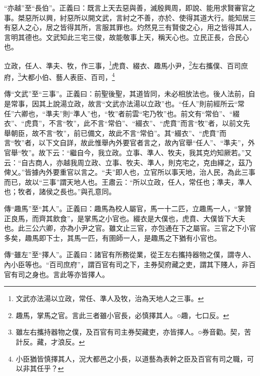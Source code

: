 {\noindent\shu{}\fzkt “亦越”至“長伯”。正義曰：既言上天去惡與善，滅殷興周，即說、能用求賢審官之事。桀惡所以興，紂惡所以開文武，言紂之不善，亦於、使得其道大行。能知居三有惡人之心，居之皆得其所，言服其罪也。灼然見三有賢俊之心，用之皆得其人，言明其德也。文武知此三宅三俊，故能敬事上天，稱天心也。立民正長，合民心也。 \par}

立政，任人、準夫、牧，作三事，\footnote{文武亦法湯以立政，常任、準人及牧，治為天地人之三事。}虎賁、綴衣、趣馬小尹，\footnote{趣馬，掌馬之官。言此三者雖小官長，必慎擇其人。○趣，七口反。}左右攜僕、百司庶府，\footnote{雖左右攜持器物之僕，及百官有司主券契藏吏，亦皆擇人。○券音勸。契，苦計反。藏，才浪反。}大都小伯、藝人表臣、百司，\footnote{小臣猶皆慎擇其人，況大都邑之小長，以道藝為表幹之臣及百官有司之職，可以非其任乎？}


{\noindent\zhuan{}\fzbyks 傳“文武”至“三事”。正義曰：前聖後聖，其道皆同，未必相放法也。後人法前，自是常事，因其上說湯立政，故言“文武亦法湯以立政”也。“任人”則前經所云“常任”六卿也，“準夫”則“準人”也，“牧”者前雲“宅乃牧”也。前文有“常伯”、“綴衣”、“虎賁”，不言“牧”，此不言“常伯”、“綴衣”、“虎賁”而言“牧”者，以前文先舉朝臣，故不言“牧”，前已備文，故此不言“常伯”。其“綴衣”、“虎賁”而言“牧”者，以下文自詳，故此惟舉內外要官者言之，故內官舉“任人”、“準夫”，外官舉“牧”。故下云：“繼自今，我立政。立事、準人、牧夫，我其克灼知厥若。”又云：“自古商人，亦越我周立政、立事、牧夫、準人，則克宅之，克由繹之，茲乃俾乂。”皆據內外要重官以言之。“夫”即人也，立官所以事天地，治人民，為此三事而已，故以“三事”謂天地人也。王肅云：“所以立政，任人，常任也；準夫，準人也；牧者，諸侯之長也。”與孔意同。 \par}

{\noindent\zhuan{}\fzbyks 傳“趣馬”至“其人”。正義曰：趣馬為校人屬官，馬一十二匹，立趣馬一人，“掌贊正良馬，而齊其飲食”，是掌馬之小官也。綴衣是大僕也，虎賁、大僕皆下大夫也。此三公六卿，亦為小尹之官。雖文止三官，亦包通在下之屬官。三官之下小官多矣，趣馬即下士，其馬一匹，有圉師一人，是趣馬之下猶有小官也。 \par}

{\noindent\zhuan{}\fzbyks 傳“雖左”至“擇人”。正義曰：諸官有所務從業，從王左右攜持器物之僕，謂寺人、內小臣等也。“百司庶府”，謂百官有司之下，主券契府藏之吏，謂其下賤人，非百官有司之身也。言此等亦皆擇人。 \par}

